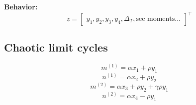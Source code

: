 \documentclass[11pt]{article}
\begin{document}
\textbf{Behavior:} \\
\[z = \begin{bmatrix} y_1, y_2, y_3, y_4, \Delta_T, \text{sec moments...} \end{bmatrix}^\top \]



\subsection{Chaotic limit cycles}
\[m^{(1)} = \alpha x_1 + \rho y_1\]
\[n^{(1)} = \alpha x_2 + \rho y_2 \]
\[m^{(2)} = \alpha x_3 + \rho y_2 + \gamma \rho y_1 \]
\[n^{(2)} = \alpha x_4 - \rho y_1\]
\end{document}
